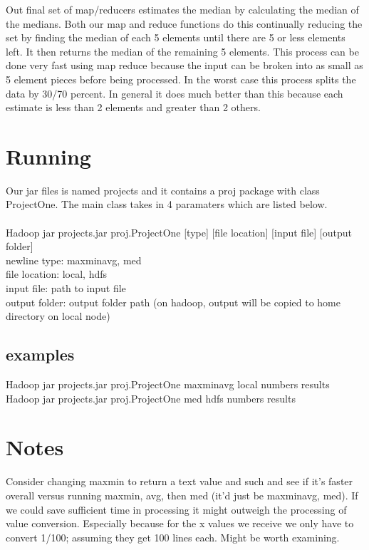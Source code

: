 \documentclass[11pt]{article}
\begin{document}
Out final set of map/reducers estimates the median by calculating the median of the medians.  Both our map and reduce functions do this continually reducing the set by finding the median of each 5 elements until there are 5 or less elements left.  It then returns the median of the remaining 5 elements.  This process can be done very fast using map reduce because the input can be broken into as small as 5 element pieces before being processed.  In the worst case this process splits the data by 30/70 percent.  In general it does much better than this because each estimate is less than 2 elements and greater than 2 others.  

\section{Running}
Our jar files is named projects and it contains a proj package with class ProjectOne.  The main class takes in 4 paramaters which are listed below.\\\\
Hadoop jar projects.jar proj.ProjectOne [type] [file location] [input file] [output folder]\\
newline type: maxminavg, med\\
file location: local, hdfs\\
input file: path to input file\\
output folder: output folder path (on hadoop, output will be copied to home directory on local node)\\

\subsection*{examples}
Hadoop jar projects.jar proj.ProjectOne maxminavg local numbers results\\
Hadoop jar projects.jar proj.ProjectOne med hdfs numbers results


\section*{Notes}
Consider changing maxmin to return a text value and such and see if it's faster overall versus running maxmin, avg, then med (it'd just be maxminavg, med).  If we could save sufficient time in processing it might outweigh the processing of value conversion.  Especially because for the x values we receive we only have to convert 1/100; assuming they get 100 lines each.  Might be worth examining.
\end{document}
